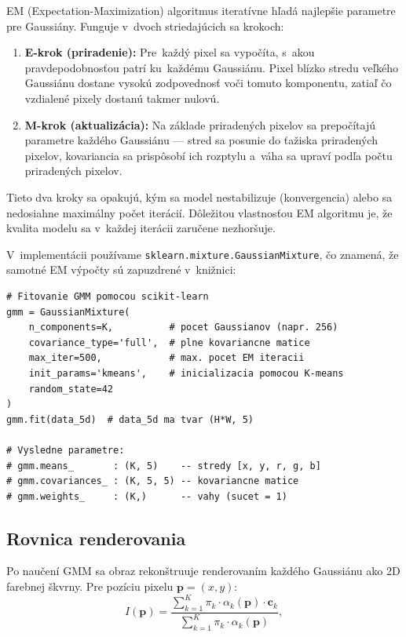 \documentclass[a4paper,11pt]{article}
\begin{document}
EM (Expectation-Maximization) algoritmus iteratívne hľadá najlepšie
parametre pre Gaussiány.  Funguje v~dvoch striedajúcich sa krokoch:

\begin{enumerate}[nosep]
  \item \textbf{E-krok (priradenie):} Pre~každý pixel sa vypočíta,
        s~akou pravdepodobnosťou patrí ku~každému Gaussiánu.
        Pixel blízko stredu veľkého Gaussiánu dostane vysokú zodpovednosť
        voči tomuto komponentu, zatiaľ čo vzdialené pixely dostanú takmer
        nulovú.
  \item \textbf{M-krok (aktualizácia):} Na základe priradených pixelov
        sa prepočítajú parametre každého Gaussiánu --- stred sa posunie
        do ťažiska priradených pixelov, kovariancia sa prispôsobí ich
        rozptylu a~váha sa upraví podľa počtu priradených pixelov.
\end{enumerate}

Tieto dva kroky sa opakujú, kým sa model nestabilizuje (konvergencia)
alebo sa nedosiahne maximálny počet iterácií.  Dôležitou vlastnosťou
EM algoritmu je, že kvalita modelu sa v~každej iterácii zaručene
nezhoršuje.

V~implementácii používame \texttt{sklearn.mixture.GaussianMixture}, čo
znamená, že samotné EM výpočty sú zapuzdrené v~knižnici:

\begin{lstlisting}
# Fitovanie GMM pomocou scikit-learn
gmm = GaussianMixture(
    n_components=K,          # pocet Gaussianov (napr. 256)
    covariance_type='full',  # plne kovariancne matice
    max_iter=500,            # max. pocet EM iteracii
    init_params='kmeans',    # inicializacia pomocou K-means
    random_state=42
)
gmm.fit(data_5d)  # data_5d ma tvar (H*W, 5)

# Vysledne parametre:
# gmm.means_       : (K, 5)    -- stredy [x, y, r, g, b]
# gmm.covariances_ : (K, 5, 5) -- kovariancne matice
# gmm.weights_     : (K,)      -- vahy (sucet = 1)
\end{lstlisting}

\subsection{Rovnica renderovania}
\label{subsec:render_eq}

Po naučení GMM sa obraz rekonštruuje renderovaním každého Gaussiánu ako
2D farebnej škvrny.  Pre pozíciu pixelu $\mathbf{p} = (x, y)$:
\begin{equation}
  I(\mathbf{p}) = \frac{\sum_{k=1}^{K} \pi_k \cdot \alpha_k(\mathbf{p})
                  \cdot \mathbf{c}_k}{\sum_{k=1}^{K} \pi_k \cdot \alpha_k(\mathbf{p})},
  \label{eq:render}
\end{equation}
\end{document}
